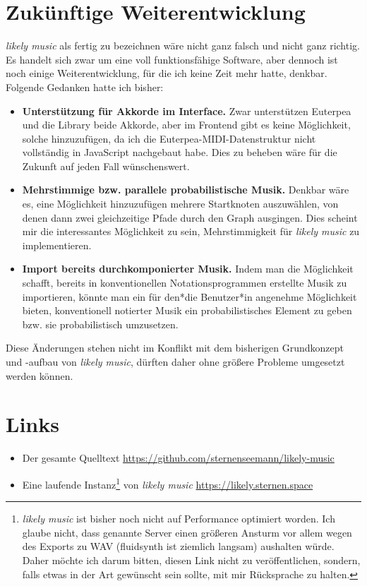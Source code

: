 \documentclass[a4paper,twocolumn]{article}
\begin{document}
\section*{Zukünftige Weiterentwicklung}

{\it likely music} als fertig zu bezeichnen wäre nicht ganz falsch und nicht
ganz richtig. Es handelt sich zwar um eine voll funktionsfähige Software, aber
dennoch ist noch einige Weiterentwicklung, für die ich keine Zeit mehr hatte,
denkbar. Folgende Gedanken hatte ich
bisher:

\begin{itemize}
  \item {\bf Unterstützung für Akkorde im Interface.} Zwar unterstützen Euterpea
    und die Library beide Akkorde, aber im Frontend gibt es keine Möglichkeit,
    solche hinzuzufügen, da ich die Euterpea-MIDI-Datenstruktur nicht
    vollständig in JavaScript nachgebaut habe. Dies zu beheben wäre für die
    Zukunft auf jeden Fall wünschenswert.
  \item {\bf Mehrstimmige bzw. parallele probabilistische Musik.} Denkbar wäre
    es, eine Möglichkeit hinzuzufügen mehrere Startknoten auszuwählen, von denen
    dann zwei gleichzeitige Pfade durch den Graph ausgingen. Dies scheint mir
    die interessantes Möglichkeit zu sein, Mehrstimmigkeit für {\it likely music}
    zu implementieren.
  \item {\bf Import bereits durchkomponierter Musik.} Indem man die Möglichkeit
    schafft, bereits in
    konventionellen Notationsprogrammen erstellte Musik zu importieren, könnte man
    ein für den*die Benutzer*in angenehme Möglichkeit bieten, konventionell
    notierter Musik ein probabilistisches Element zu geben bzw. sie
    probabilistisch umzusetzen.
\end{itemize}

Diese Änderungen stehen nicht im Konflikt mit dem bisherigen Grundkonzept und -aufbau von
{\it likely music}, dürften daher ohne größere Probleme umgesetzt werden können.

\section*{Links}

\begin{itemize}
\item Der gesamte Quelltext \url{https://github.com/sternenseemann/likely-music}
\item Eine laufende Instanz\footnote{{\it likely music} ist bisher noch nicht
  auf Performance optimiert worden. Ich glaube nicht, dass genannte Server einen
    größeren Ansturm vor allem wegen des Exports zu WAV (fluidsynth
    \cite{fluidsynth} ist ziemlich
    langsam) aushalten würde. Daher möchte ich darum bitten, diesen Link nicht
    zu veröffentlichen, sondern, falls etwas in der Art gewünscht sein sollte,
    mit mir Rücksprache zu halten.} von {\it likely music} \url{https://likely.sternen.space}
\end{itemize}
\end{document}
